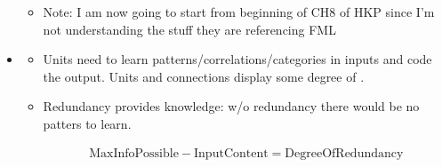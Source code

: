 \documentclass[12pt]{article}
\begin{document}
\begin{itemize}
\begin{itemize}
		\item Note: I am now going to start from beginning of CH8 of HKP since I'm not understanding the stuff they are referencing FML
	\end{itemize}
	
	\item {}
	\begin{itemize}
		\item Units need to learn patterns/correlations/categories in inputs and code the output. Units and connections display some degree of . 
		\item Redundancy provides knowledge: w/o redundancy there would be no patters to learn. 
		\begin{footnotesize}
		\begin{align}
			\text{MaxInfoPossible}-\text{InputContent} = \text{DegreeOfRedundancy}
		\end{align}
		\end{footnotesize}
		

\end{itemize}
\end{itemize}
\end{document}
